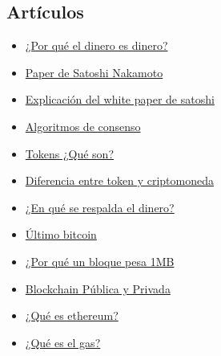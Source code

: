 \documentclass[a4paper,12pt]{/home/armando/Documentos/Cursos/LaTeX/Plantillas/lib/pub}
\begin{document}
\subsection{Artículos}
\begin{itemize}
	\item \href{https://cryptocoinunexpo.wordpress.com/2018/08/10/por-que-el-dinero-es-dinero/}{¿Por qué el dinero es dinero?}
	\item \href{https://bitcoin.org/files/bitcoin-paper/bitcoin\_es\_latam.pdf}{Paper de Satoshi Nakamoto}
	\item \href{https://medium.com/coinmonks/bitcoin-white-paper-explained-part-1-4-16cba783146a}{Explicación del white paper de satoshi}
	\item \href{https://101blockchains.com/es/algoritmos-de-consenso-blockchain/}{Algoritmos de consenso}
	\item \href{https://www.criptonoticias.com/mercados/que-son-tokens-como-diferencian-criptomonedas/}{Tokens ¿Qué son?}
	\item \href{https://medium.com/@LatamBlock/la-diferencia-entre-un-token-y-una-criptomoneda-673a977e16be}{Diferencia entre token y criptomoneda}
	\item \href{https://www.europapress.es/economia/noticia-llevamos-45-anos-utilizando-dinero-fiat-sabes-20160221084939.html}{¿En qué se respalda el dinero?}
	\item \href{https://es.cointelegraph.com/news/experts-indicate-that-the-last-bitcoin-will-be-mined-in-the-year-2140}{Último bitcoin}
	\item \href{https://es.cointelegraph.com/news/satoshis-best-kept-secret-why-is-there-a-1-mb-limit-to-bitcoin-block-size}{¿Por qué un bloque pesa 1MB}
	\item \href{https://medium.com/@marvin.soto/blockchain-público-vs-blockchain-privado-cuál-es-la-diferencia-8115be4a593b}{Blockchain Pública y Privada}
	\item \href{https://hipertextual.com/2017/12/que-es-ethereum-que-ofrece-respecto-otras-criptomonedas
	}{¿Qué es ethereum?}
	\item \href{https://medium.com/astec/entendiendo-el-gas-en-ethereum-e77a6f30090f}{¿Qué es el gas?}
\end{itemize}
\end{document}
